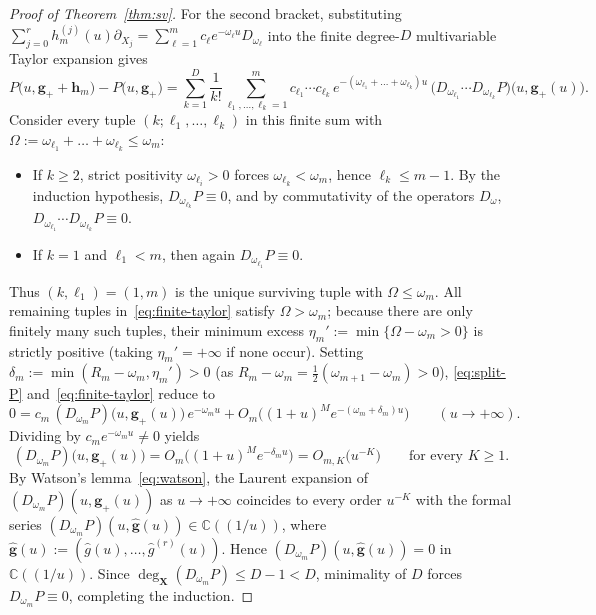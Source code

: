 \documentclass[10pt,reqno]{amsart}
\numberwithin{equation}{section}
\theoremstyle{definition}
\newcommand{\C}{\mathbb{C}}
\begin{document}
\begin{proof}[Proof of Theorem~\ref{thm:sv}]
For the second bracket, substituting $\sum_{j=0}^r h_m^{(j)}(u)\partial_{X_j} = \sum_{\ell=1}^m c_\ell e^{-\omega_\ell u} D_{\omega_\ell}$ into the finite degree-$D$ multivariable Taylor expansion gives
\begin{equation}\label{eq:finite-taylor}
  P\bigl(u, \mathbf{g}_+ + \mathbf{h}_m\bigr) - P\bigl(u, \mathbf{g}_+\bigr)
  = \sum_{k=1}^D \frac{1}{k!} \sum_{\ell_1, \dots, \ell_k = 1}^m c_{\ell_1} \cdots c_{\ell_k}\,
  e^{-(\omega_{\ell_1} + \dots + \omega_{\ell_k}) u}\,
  \bigl(D_{\omega_{\ell_1}} \cdots D_{\omega_{\ell_k}} P\bigr)\bigl(u, \mathbf{g}_+(u)\bigr).
\end{equation}
Consider every tuple $(k; \ell_1, \dots, \ell_k)$ in this finite sum with $\Omega := \omega_{\ell_1} + \dots + \omega_{\ell_k} \le \omega_m$:
\begin{itemize}
  \item If $k \ge 2$, strict positivity $\omega_{\ell_i} > 0$ forces $\omega_{\ell_k} < \omega_m$, hence $\ell_k \le m - 1$. By the induction hypothesis, $D_{\omega_{\ell_k}} P \equiv 0$, and by commutativity of the operators $D_\omega$, $D_{\omega_{\ell_1}} \cdots D_{\omega_{\ell_k}} P \equiv 0$.
  \item If $k = 1$ and $\ell_1 < m$, then again $D_{\omega_{\ell_1}} P \equiv 0$.
\end{itemize}
Thus $(k, \ell_1) = (1, m)$ is the unique surviving tuple with $\Omega \le \omega_m$. All remaining tuples in~\eqref{eq:finite-taylor} satisfy $\Omega > \omega_m$; because there are only finitely many such tuples, their minimum excess $\eta_m' := \min\{\Omega - \omega_m > 0\}$ is strictly positive (taking $\eta_m' = +\infty$ if none occur). Setting $\delta_m := \min(R_m - \omega_m, \eta_m') > 0$ (as $R_m - \omega_m = \frac{1}{2}(\omega_{m+1} - \omega_m) > 0$), \eqref{eq:split-P} and~\eqref{eq:finite-taylor} reduce to
\[
  0 = c_m\, (D_{\omega_m} P)\bigl(u, \mathbf{g}_+(u)\bigr)\, e^{-\omega_m u} + O_m\bigl((1+u)^M e^{-(\omega_m + \delta_m) u}\bigr)
  \qquad (u \to +\infty).
\]
Dividing by $c_m e^{-\omega_m u} \neq 0$ yields
\[
  (D_{\omega_m} P)\bigl(u, \mathbf{g}_+(u)\bigr) = O_m\bigl((1+u)^M e^{-\delta_m u}\bigr) = O_{m,K}\bigl(u^{-K}\bigr)
  \qquad \text{for every } K \ge 1.
\]
By Watson's lemma~\eqref{eq:watson}, the Laurent expansion of $(D_{\omega_m} P)(u, \mathbf{g}_+(u))$ as $u \to +\infty$ coincides to every order $u^{-K}$ with the formal series $(D_{\omega_m} P)(u, \widehat{\mathbf{g}}(u)) \in \C((1/u))$, where $\widehat{\mathbf{g}}(u) := (\widehat{g}(u), \dots, \widehat{g}^{(r)}(u))$. Hence $(D_{\omega_m} P)(u, \widehat{\mathbf{g}}(u)) = 0$ in $\C((1/u))$. Since $\deg_{\mathbf{X}}(D_{\omega_m} P) \le D - 1 < D$, minimality of $D$ forces $D_{\omega_m} P \equiv 0$, completing the induction.


\end{proof}
\end{document}

